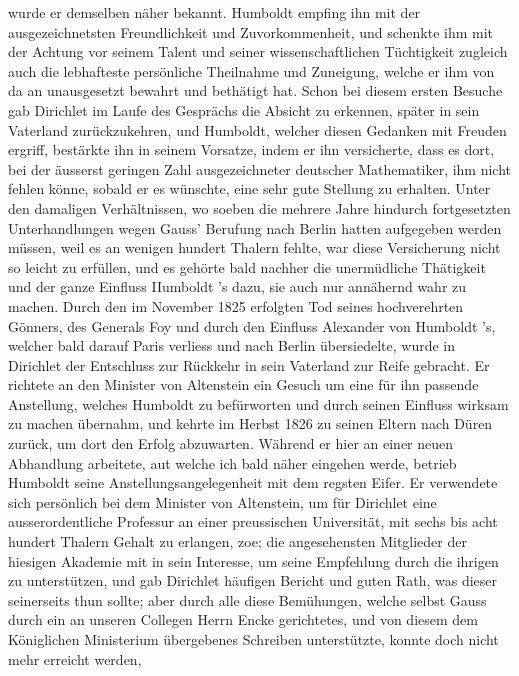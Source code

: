 \documentclass[11pt]{article}
\begin{document}
\noindent wurde er demselben näher bekannt. Humboldt empfing ihn mit der ausgezeichnetsten Freundlichkeit und Zuvorkommenheit, und schenkte ihm mit der Achtung vor seinem Talent und seiner wissenschaftlichen Tüchtigkeit zugleich auch die lebhafteste persönliche Theilnahme und Zuneigung, welche er ihm von da an unausgesetzt bewahrt und bethätigt hat. Schon bei diesem ersten Besuche gab Dirichlet im Laufe des Gesprächs die Absicht zu erkennen, später in sein Vaterland zurückzukehren, und Humboldt, welcher diesen Gedanken mit Freuden ergriff, bestärkte ihn in seinem Vorsatze, indem er ihn versicherte, dass es dort, bei der äusserst geringen Zahl ausgezeichneter deutscher Mathematiker, ihm nicht fehlen könne, sobald er es wünschte, eine sehr gute Stellung zu erhalten. Unter den damaligen Verhältnissen, wo soeben die mehrere Jahre hindurch fortgesetzten Unterhandlungen wegen Gauss’ Berufung nach Berlin hatten aufgegeben werden müssen, weil es an wenigen hundert Thalern fehlte, war diese Versicherung nicht so leicht zu erfüllen, und es gehörte bald nachher die unermüdliche Thätigkeit und der ganze Einfluss IIumboldt ’s dazu, sie auch nur annähernd wahr zu machen. Durch den im November 1825 erfolgten Tod seines hochverehrten Gönners, des Generals Foy und durch den Einfluss Alexander von Humboldt ’s, welcher bald darauf Paris verliess und nach Berlin übersiedelte, wurde in Dirichlet der Entschluss zur Rückkehr in sein Vaterland zur Reife gebracht. Er richtete an den Minister von Altenstein ein Gesuch um eine für ihn passende Anstellung, welches Humboldt zu befürworten und durch seinen Einfluss wirksam zu machen übernahm, und kehrte im Herbst 1826 zu seinen Eltern nach Düren zurück, um dort den Erfolg abzuwarten. Während er hier an einer neuen Abhandlung arbeitete, aut welche ich bald näher eingehen werde, betrieb Humboldt seine Anstellungsangelegenheit mit dem regsten Eifer. Er verwendete sich persönlich bei dem Minister von Altenstein, um für Dirichlet eine ausserordentliche Professur an einer preussischen Universität, mit sechs bis acht hundert Thalern Gehalt zu erlangen, zoe; die angesehensten Mitglieder der hiesigen Akademie mit in sein Interesse, um seine Empfehlung durch die ihrigen zu unterstützen, und gab Dirichlet häufigen Bericht und guten Rath, was dieser seinerseits thun sollte; aber durch alle diese Bemühungen, welche selbst Gauss durch ein an unseren Collegen Herrn Encke gerichtetes, und von diesem dem Königlichen Ministerium übergebenes Schreiben unterstützte, konnte doch nicht mehr erreicht werden, 
\par
\end{document}

